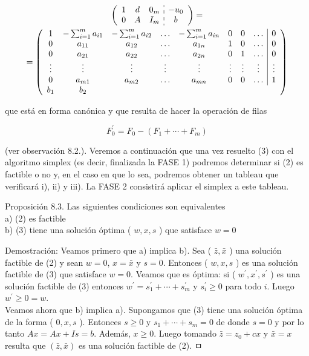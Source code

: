 \documentclass[10pt]{article}
\begin{document}
$$
\begin{gathered}
\left(\begin{array}{ccc:c}
1 & d & 0_{m} & -u_{0} \\
0 & A & I_{m} & b
\end{array}\right)= \\
=\left(\begin{array}{cccccccc|c}
1 & -\sum_{i=1}^{m} a_{i 1} & -\sum_{i=1}^{m} a_{i 2} & \ldots & -\sum_{i=1}^{m} a_{i n} & 0 & 0 & \ldots & 0 \\
0 & a_{11} & a_{12} & \ldots & a_{1 n} & 1 & 0 & \ldots & 0 \\
0 & a_{21} & a_{22} & \ldots & a_{2 n} & 0 & 1 & \ldots & 0 \\
\vdots & \vdots & \vdots & \vdots & \vdots & \vdots & \vdots & \vdots & \vdots \\
0 & a_{m 1} & a_{m 2} & \ldots & a_{m n} & 0 & 0 & \ldots & 1 \\
b_{1} & b_{2}
\end{array}\right)
\end{gathered}
$$

que está en forma canónica y que resulta de hacer la operación de filas

$$
F_{0}^{\prime}=F_{0}-\left(F_{1}+\cdots+F_{m}\right)
$$

(ver observación 8.2.). Veremos a continuación que una vez resuelto (3) con el algoritmo simplex (es decir, finalizada la FASE 1) podremos determinar si (2) es factible o no y, en el caso en que lo sea, podremos obtener un tableau que verificará i), ii) y iii). La FASE 2 consistirá aplicar el simplex a este tableau.

Proposición 8.3. Las siguientes condiciones son equivalentes\\
a) (2) es factible\\
b) (3) tiene una solución óptima ( $w, x, s$ ) que satisface $w=0$

Demostración: Veamos primero que a) implica b). Sea ( $\bar{z}, \bar{x}$ ) una solución factible de (2) y sean $w=0$, $x=\bar{x}$ y $s=0$. Entonces ( $w, x, s$ ) es una solución factible de (3) que satisface $w=0$. Veamos que es óptima: si ( $w^{\prime}, x^{\prime}, s^{\prime}$ ) es una solución factible de (3) entonces $w^{\prime}=s_{1}^{\prime}+\cdots+s_{m}^{\prime}$ y $s_{i}^{\prime} \geq 0$ para todo $i$. Luego $w^{\prime} \geq 0=w$.\\
Veamos ahora que b) implica a). Supongamos que (3) tiene una solución óptima de la forma ( $0, x, s$ ). Entonces $s \geq 0$ y $s_{1}+\cdots+s_{m}=0$ de donde $s=0$ y por lo tanto $A x=A x+I s=b$. Además, $x \geq 0$. Luego tomando $\bar{z}=z_{0}+c x$ y $\bar{x}=x$ resulta que $(\bar{z}, \bar{x})$ es una solución factible de (2). ㅁ
\end{document}

